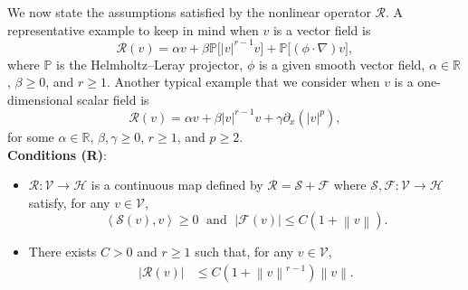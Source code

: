 \documentclass[11pt, reqno]{amsart}
\newcommand\tsout{\bgroup\markoverwith{\textcolor{red}{\rule[0.5ex]{2pt}{1.4pt}}}\ULon}
\newcommand{\stkout}[1]{\ifmmode\text{\tsout{\ensuremath{#1}}}\else\tsout{#1}\fi}
\theoremstyle{definition}
\numberwithin{equation}{section}
\newcommand{\bb}{\mathbb}
\newcommand{\norm}[1]{\left\|{#1}\right\|}
\newcommand{\inpro}[2]{\left\langle#1,#2\right\rangle}
\newcommand{\abs}[1]{\left|{#1}\right|}
\begin{document}
We now state the assumptions satisfied by the nonlinear operator $\mathcal{R}$. A representative example to keep in mind when $v$ is a vector field is
\[
\mathcal{R}(v)=\alpha v+ \beta \bb{P}\big[ |v|^{r-1} v\big] + \bb{P}\big[(\phi\cdot\nabla)v\big], 
\]
where $\bb{P}$ is the Helmholtz--Leray projector, $\phi$ is a given smooth vector field, $\alpha\in \bb{R}$, $\beta\geq 0$, and $r\geq 1$. Another typical example that we consider when $v$ is a one-dimensional scalar field is
\[
\mathcal{R}(v)= \alpha v + \beta |v|^{r-1} v + \gamma \partial_x (\abs{v}^p),
\]
for some $\alpha\in \bb{R}$, $\beta,\gamma\geq 0$, $r \geq 1$, and $p\geq 2$.
\\[1ex]
\textbf{Conditions (R)}:
\begin{itemize}
	\item[(R1)] {$\mathcal{R}:\mathcal{V}\to \mathcal{H}$ is a continuous map defined by $\mathcal{R}=\mathcal{S}+\mathcal{F}$ where $\mathcal{S}, \mathcal{F}:\mathcal{V}\to\mathcal{H}$ satisfy, for any $v\in\mathcal{V}$,}
	\begin{equation}\label{equ:Rv v pos}
		\inpro{\mathcal{S}(v)}{v} \geq 0 \;\text{ and }\; \abs{\mathcal{F}(v)} \leq C\left(1+\norm{v}\right).
	\end{equation}
	\item[(R2)] There exists $C>0$ and $r\geq 1$ such that, for any $v\in \mathcal{V}$,
    \begin{align}\label{equ:est R v in v}
		\abs{\mathcal{R}(v)}
		&\leq
		C \left(1+ \norm{v}^{r-1} \right) \norm{v}.
    \end{align}

\end{itemize}
\end{document}

